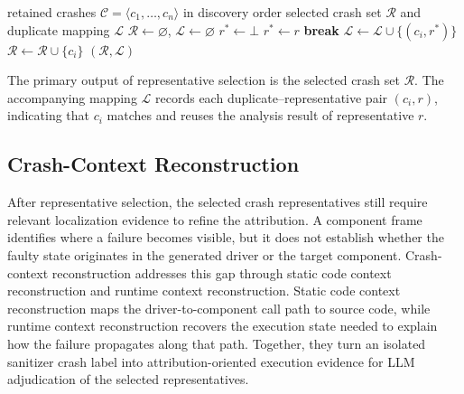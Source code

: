 \documentclass[pdflatex,sn-basic]{sn-jnl}%
\theoremstyle{thmstyleone}%
\theoremstyle{thmstyletwo}%
\theoremstyle{thmstylethree}%
\begin{document}
\begin{algorithm}[t]
\caption{Representative Selection}
\label{alg:representative-selection}
\begin{algorithmic}
\Require retained crashes \(\mathcal{C}=\langle c_1,\ldots,c_n\rangle\) in discovery order
\Ensure selected crash set \(\mathcal{R}\) and duplicate mapping \(\mathcal{L}\)
\State \(\mathcal{R}\gets\varnothing\), \(\mathcal{L}\gets\varnothing\)
    \State \(r^\ast\gets\bot\)
            \State \(r^\ast\gets r\)
            \State \textbf{break}
        \EndIf
    \EndFor
        \State \(\mathcal{L}\gets\mathcal{L}\cup\{(c_i,r^\ast)\}\)
    \Else
        \State \(\mathcal{R}\gets\mathcal{R}\cup\{c_i\}\)
    \EndIf
\EndFor
\State \Return \((\mathcal{R},\mathcal{L})\)
\end{algorithmic}
\end{algorithm}

The primary output of representative selection is the selected crash set \(\mathcal{R}\).
The accompanying mapping \(\mathcal{L}\) records each duplicate--representative pair \((c_i,r)\), indicating that \(c_i\) matches and reuses the analysis result of representative \(r\).


\subsection{Crash-Context Reconstruction}

After representative selection, the selected crash representatives still require relevant localization evidence to refine the attribution.
A component frame identifies where a failure becomes visible, but it does not establish whether the faulty state originates in the generated driver or the target component.
Crash-context reconstruction addresses this gap through static code context reconstruction and runtime context reconstruction.
Static code context reconstruction maps the driver-to-component call path to source code, while runtime context reconstruction recovers the execution state needed to explain how the failure propagates along that path.
Together, they turn an isolated sanitizer crash label into attribution-oriented execution evidence for LLM adjudication of the selected representatives.
\end{document}
